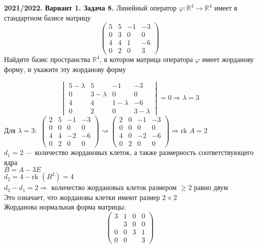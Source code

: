 \documentclass[a4paper]{article}
\newcommand{\rk}{\text{rk }}
\begin{document}
\begin{tcolorbox}[colback=blue!20!white, colframe=black!100!black]
    \textbf{2021/2022. Вариант 1. Задача 8.} Линейный оператор $\varphi:\mathbb{R}^4\rightarrow\mathbb{R}^4$ имеет в стандартном базисе матрицу 
    \begin{equation*}
    \begin{pmatrix}
        5&5&-1&-3\\
        0&3&0&0\\
        4&4&1&-6\\
        0&2&0&3
    \end{pmatrix}
    \end{equation*}
    Найдите базис пространства $\mathbb{R}^4$, в котором матрица оператора $\varphi$ имеет жорданову форму, и укажите эту жорданову форму
\end{tcolorbox}
\begin{equation*}
    \begin{vmatrix}
        5-\lambda&5&-1&-3\\
        0&3-\lambda&0&0\\
        4&4&1-\lambda&-6\\
        0&2&0&3-\lambda
    \end{vmatrix}=0\Longrightarrow \lambda=3
\end{equation*}
$\boxed{\text{Для }\lambda=3:}$ $\begin{pmatrix}
    2&5&-1&-3\\
    0&0&0&0\\
    4&4&-2&-6\\
    0&2&0&0
\end{pmatrix}\rightsquigarrow\begin{pmatrix}
    2&0&-1&-3\\
    0&0&0&0\\
    4&0&-2&-6\\
    0&2&0&0
\end{pmatrix}\Longrightarrow\rk{A}=2$\\[2mm]
$d_1=2$ — количество жордановых клеток, а также размерность соответствующего ядра\\[2mm]
$B=A-3E$\\[2mm]
$d_2=4-\rk{(B^2)}=4$\\[2mm]
$d_2-d_1=2\Longrightarrow$ количество жордановых клеток размером $\geqslant2$ равно двум\\[2mm]
Это означает, что жордановы клетки имеют размер $2\times2$\\[2mm]
Жорданова нормальная форма матрицы:
$$\left(
\begin{array}{cc|cc}
3 & 1 & 0 & 0 \\
 &  3 & 0 & 0 \\
\hline
0 & 0  & 3 & 1\\
0 & 0  &  & 3
\end{array}
\right)$$
\end{document}
